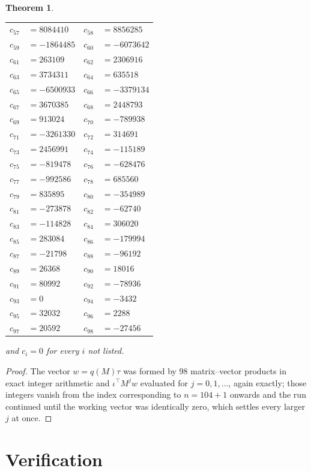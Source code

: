 \documentclass[11pt,a4paper]{article}
\theoremstyle{plain}
\newtheorem{theorem}{Theorem}
\theoremstyle{definition}
\begin{document}
\begin{theorem}
\begin{center}
\begin{tabular}{r@{\,}l@{\qquad}r@{\,}l}
$c_{57}$ & $=8084410$ & $c_{58}$ & $=8856285$ \\
$c_{59}$ & $=-1864485$ & $c_{60}$ & $=-6073642$ \\
$c_{61}$ & $=263109$ & $c_{62}$ & $=2306916$ \\
$c_{63}$ & $=3734311$ & $c_{64}$ & $=635518$ \\
$c_{65}$ & $=-6500933$ & $c_{66}$ & $=-3379134$ \\
$c_{67}$ & $=3670385$ & $c_{68}$ & $=2448793$ \\
$c_{69}$ & $=913024$ & $c_{70}$ & $=-789938$ \\
$c_{71}$ & $=-3261330$ & $c_{72}$ & $=314691$ \\
$c_{73}$ & $=2456991$ & $c_{74}$ & $=-115189$ \\
$c_{75}$ & $=-819478$ & $c_{76}$ & $=-628476$ \\
$c_{77}$ & $=-992586$ & $c_{78}$ & $=685560$ \\
$c_{79}$ & $=835895$ & $c_{80}$ & $=-354989$ \\
$c_{81}$ & $=-273878$ & $c_{82}$ & $=-62740$ \\
$c_{83}$ & $=-114828$ & $c_{84}$ & $=306020$ \\
$c_{85}$ & $=283084$ & $c_{86}$ & $=-179994$ \\
$c_{87}$ & $=-21798$ & $c_{88}$ & $=-96192$ \\
$c_{89}$ & $=26368$ & $c_{90}$ & $=18016$ \\
$c_{91}$ & $=80992$ & $c_{92}$ & $=-78936$ \\
$c_{93}$ & $=0$ & $c_{94}$ & $=-3432$ \\
$c_{95}$ & $=32032$ & $c_{96}$ & $=2288$ \\
$c_{97}$ & $=20592$ & $c_{98}$ & $=-27456$ \\
\end{tabular}
\end{center}
and $c_i=0$ for every $i$ not listed.
\end{theorem}

\begin{proof}
The vector $w=q(M)\tau$ was formed by $98$ matrix--vector products in exact integer
arithmetic and $\iota^{\!\top}M^{j}w$ evaluated for $j=0,1,\dots$, again exactly; those
integers vanish from the index corresponding to $n=104+1$ onwards and the run continued
until the working vector was identically zero, which settles every larger $j$ at once.
\end{proof}

\section{Verification}
\end{document}
